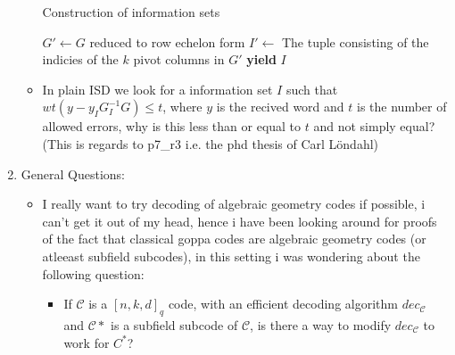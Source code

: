 \documentclass[11pt]{article}
\begin{document}
\begin{enumerate}
\begin{itemize}
\begin{algorithm}[H]
\caption{Construction of information sets}\label{alg:information_set}
\begin{algorithmic}
  \State $G' \gets G$ reduced to row echelon form
  \State $I' \gets$ The tuple consisting of the indicies of the $k$ pivot columns in $G'$
    \State \textbf{yield} $I$ 
  \EndFor
  \EndProcedure
\end{algorithmic}
\end{algorithm}


\item In plain ISD we look for a information set \(I\) such that \(wt(y - y_IG_I^{-1}G) \leq t\), where \(y\) is the recived word and \(t\) is the number of allowed errors, why is this less than or equal to \(t\) and not simply equal? (This is regards to p7\_r3 i.e. the phd thesis of Carl Löndahl)
\end{itemize}

\item General Questions:
\begin{itemize}
\item I really want to try decoding of algebraic geometry codes if possible, i can't get it out of my head, hence i have been looking around for proofs of the fact that classical goppa codes are algebraic geometry codes (or atleeast subfield subcodes), in this setting i was wondering about the following question:
\begin{itemize}
\item If \(\mathcal{C}\) is a \([n, k, d]_q\) code, with an efficient decoding algorithm \(dec_\mathcal{C}\) and \(\mathcal{C}*\) is a subfield subcode of \(\mathcal{C}\), is there a way to modify \(dec_{\mathcal{C}}\) to work for \(C^{*}\)?
\end{itemize}
\end{itemize}
\end{enumerate}
\end{document}
